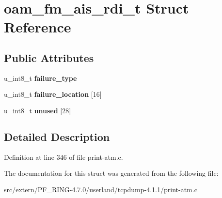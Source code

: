 \hypertarget{structoam__fm__ais__rdi__t}{
\section{oam\_\-fm\_\-ais\_\-rdi\_\-t Struct Reference}
\label{structoam__fm__ais__rdi__t}
}
\subsection*{Public Attributes}
\begin{DoxyCompactItemize}
\item 
\hypertarget{structoam__fm__ais__rdi__t_ab0fb67bc807157e2b6c92a2274958c61}{
u\_\-int8\_\-t {\bfseries failure\_\-type}}
\label{structoam__fm__ais__rdi__t_ab0fb67bc807157e2b6c92a2274958c61}

\item 
\hypertarget{structoam__fm__ais__rdi__t_a7ed3efddd08a699c2fc787fb98fae29b}{
u\_\-int8\_\-t {\bfseries failure\_\-location} \mbox{[}16\mbox{]}}
\label{structoam__fm__ais__rdi__t_a7ed3efddd08a699c2fc787fb98fae29b}

\item 
\hypertarget{structoam__fm__ais__rdi__t_a097e83de941f00b9dc03c5a5e4d3d647}{
u\_\-int8\_\-t {\bfseries unused} \mbox{[}28\mbox{]}}
\label{structoam__fm__ais__rdi__t_a097e83de941f00b9dc03c5a5e4d3d647}

\end{DoxyCompactItemize}


\subsection{Detailed Description}


Definition at line 346 of file print-\/atm.c.



The documentation for this struct was generated from the following file:\begin{DoxyCompactItemize}
\item 
src/extern/PF\_\-RING-\/4.7.0/userland/tcpdump-\/4.1.1/print-\/atm.c\end{DoxyCompactItemize}
